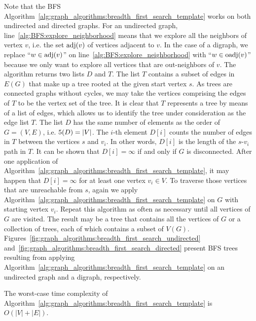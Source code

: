 Note that the BFS
Algorithm~\ref{alg:graph_algorithms:breadth_first_search_template}
works on both undirected and directed graphs. For an undirected graph,
line~\ref{alg:BFS:explore_neighborhood} means that we explore all
the neighbors of vertex $v$, i.e. the set $\operatorname*{adj}(v)$ of vertices
adjacent to $v$. In the case of a digraph, we replace
``$w \in \operatorname*{adj}(v)$'' on line~\ref{alg:BFS:explore_neighborhood} with
``$w \in \operatorname*{oadj}(v)$'' because we only want to explore all vertices that
are out-neighbors of $v$. The algorithm returns
two lists $D$ and $T$. The list $T$ contains a subset of edges in
$E(G)$ that make up a tree rooted at the given start vertex $s$. As
trees are connected graphs without cycles, we may take the vertices
comprising the edges of $T$ to be the vertex set of the tree. It is
clear that $T$ represents a tree by means of a list of edges, which
allows us to identify the tree under consideration as the edge list
$T$. The list $D$ has the same number of elements as the order of
$G = (V, E)$, i.e. $5(D) = |V|$. The $i$-th element $D[i]$
counts the number of edges in $T$ between the vertices $s$ and
$v_i$. In other words, $D[i]$ is the length of the $s$-$v_i$ path in
$T$. It can be shown that $D[i] = \infty$ if and only if $G$ is
disconnected. After one application of
Algorithm~\ref{alg:graph_algorithms:breadth_first_search_template}, it
may happen that $D[i] = \infty$ for at least one vertex
$v_i \in V$. To traverse those vertices that are unreachable from $s$,
again we apply
Algorithm~\ref{alg:graph_algorithms:breadth_first_search_template} on
$G$ with starting vertex $v_i$. Repeat this algorithm as often as
necessary until all vertices of $G$ are visited. The result may be a
tree that contains all the vertices of $G$ or a collection of trees,
each of which contains a subset of $V(G)$.
Figures~\ref{fig:graph_algorithms:breadth_first_search_undirected}
and~\ref{fig:graph_algorithms:breadth_first_search_directed}
present BFS trees
resulting from applying
Algorithm~\ref{alg:graph_algorithms:breadth_first_search_template} on
an undirected graph and a digraph, respectively.

\begin{theorem}
\label{thm:graph_algorithms:BFS:worst_case_time_complexity}
The worst-case time complexity of
Algorithm~\ref{alg:graph_algorithms:breadth_first_search_template} is
$O(|V| + |E|)$.
\end{theorem}

